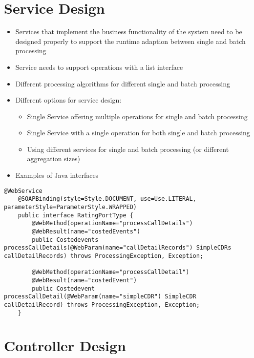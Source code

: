 \section{Service Design}

\begin{itemize}
	\item Services that implement the business functionality of the system need to be designed properly to support the runtime adaption between single and batch processing
	\item Service needs to support operations with a list interface
	\item Different processing algorithms for different single and batch processing
	\item Different options for service design:
	\begin{itemize}
		\item Single Service offering multiple operations for single and batch processing
		\item Single Service with a single operation for both single and batch processing
		\item Using different services for single and batch processing (or different aggregation sizes)
	\end{itemize}
	\item Examples of Java interfaces
\end{itemize}

\begin{lstlisting}[caption={Java interface of a web  service offering different operations for single and batch processing.},label=listing:ch5_service_design_if]
	@WebService
	@SOAPBinding(style=Style.DOCUMENT, use=Use.LITERAL, parameterStyle=ParameterStyle.WRAPPED)
	public interface RatingPortType {
		@WebMethod(operationName="processCallDetails")
		@WebResult(name="costedEvents")
		public Costedevents processCallDetails(@WebParam(name="callDetailRecords") SimpleCDRs callDetailRecords) throws ProcessingException, Exception;
	
		@WebMethod(operationName="processCallDetail")
		@WebResult(name="costedEvent")
		public Costedevent processCallDetail(@WebParam(name="simpleCDR") SimpleCDR callDetailRecord) throws ProcessingException, Exception;
	}
\end{lstlisting}

\section{Controller Design}

